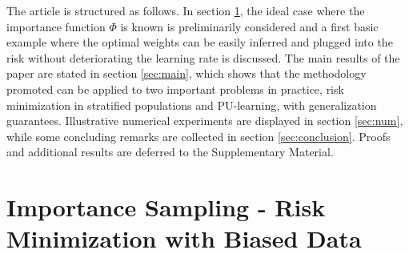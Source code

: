 \documentclass[12pt]{article}
\begin{document}
 The article is structured as follows. In section \ref{sec:background}, the ideal case where the importance function $\Phi$ is known is preliminarily considered and a first basic example where the optimal weights can be easily inferred and plugged into the risk without deteriorating the learning rate is discussed. The main results of the paper are stated in section \ref{sec:main}, which shows that the methodology promoted can be applied to two important problems in practice, risk minimization in stratified populations and PU-learning, with generalization guarantees. Illustrative numerical experiments are displayed in section \ref{sec:num}, while some concluding remarks are collected in section \ref{sec:conclusion}. Proofs and additional results are deferred to the Supplementary Material.
 

\section{Importance Sampling - Risk Minimization with Biased Data}
\label{sec:background}
\end{document}
